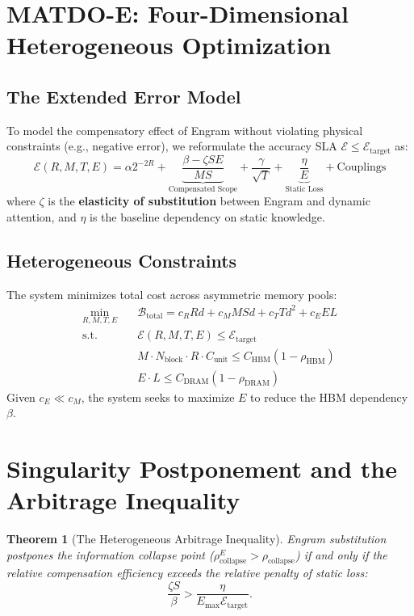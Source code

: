 \documentclass[11pt,a4paper]{article}
\theoremstyle{plain}
\newtheorem{theorem}{Theorem}[section]
\theoremstyle{definition}
\begin{document}
\section{MATDO-E: Four-Dimensional Heterogeneous Optimization}

\subsection{The Extended Error Model}

To model the compensatory effect of Engram without violating physical constraints (e.g., negative error), we reformulate the accuracy SLA $\mathcal{E} \leq \mathcal{E}_{\text{target}}$ as:
\begin{equation}
\mathcal{E}(R,M,T,E) = \alpha 2^{-2R} + \underbrace{\frac{\beta - \zeta S E}{MS}}_{\text{Compensated Scope}} + \frac{\gamma}{\sqrt{T}} + \underbrace{\frac{\eta}{E}}_{\text{Static Loss}} + \text{Couplings}
\end{equation}
where $\zeta$ is the \textbf{elasticity of substitution} between Engram and dynamic attention, and $\eta$ is the baseline dependency on static knowledge.

\subsection{Heterogeneous Constraints}

The system minimizes total cost across asymmetric memory pools:
\begin{align}
\min_{R,M,T,E} \quad & \mathcal{B}_{\text{total}} = c_R R d + c_M M S d + c_T T d^2 + c_{E} E L \label{eq:cost_e}\\
\text{s.t.} \quad & \mathcal{E}(R,M,T,E) \leq \mathcal{E}_{\text{target}} \label{eq:sla_e}\\
& M \cdot N_{\text{block}} \cdot R \cdot C_{\text{unit}} \leq C_{\text{HBM}}(1-\rho_{\text{HBM}}) \label{eq:hbm}\\
& E \cdot L \leq C_{\text{DRAM}}(1-\rho_{\text{DRAM}}) \label{eq:dram}
\end{align}
Given $c_E \ll c_M$, the system seeks to maximize $E$ to reduce the HBM dependency $\beta$.

\section{Singularity Postponement and the Arbitrage Inequality}



\begin{theorem}[The Heterogeneous Arbitrage Inequality]\label{thm:arbitrage}
Engram substitution postpones the information collapse point ($\rho_{\text{collapse}}^E > \rho_{\text{collapse}}$) if and only if the relative compensation efficiency exceeds the relative penalty of static loss:
\begin{equation}
    \frac{\zeta S}{\beta} > \frac{\eta}{E_{\max} \mathcal{E}_{\text{target}}}.
\end{equation}
\end{theorem}
\end{document}
